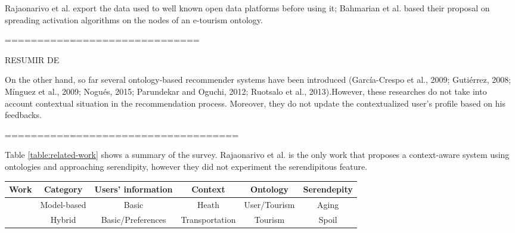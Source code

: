 Rajaonarivo et al. \cite{rajaonarivo2019rec} export the data used to well known open data platforms before using it; Bahmarian et al. \cite{bahramian_abbaspour_claramunt_2017} based their proposal on spreading activation algorithms on the nodes of an e-tourism ontology.

==============================

RESUMIR DE \cite{bahramian_abbaspour_claramunt_2017}


On  the other hand,  so  far  several  ontology-based  recommender systems  have  been  introduced (García-Crespo  et  al.,  2009;  Gutiérrez,  2008; Mínguez  et  al.,  2009;  Nogués,  2015;  Parundekar  and  Oguchi, 2012;  Ruotsalo  et  al.,  2013).However,  these  researches  do  not take  into  account  contextual  situation  in the recommendation process. Moreover, they do not update the contextualized user’s profile based on his feedbacks.

====================================


Table \ref{table:related-work} shows a summary of the survey. Rajaonarivo et al. \cite{rajaonarivo2019rec} is the only work that proposes a context-aware system using ontologies and approaching serendipity, however they did not experiment the serendipitous feature.


\begin{table*}[h!]
    \centering
    \caption{Related work on recommender systems for e-tourism}
    \label{table:related-work}
    \begin{tabular}{|c|c|c|c|c|c|} 
        \hline
        \textbf{Work} & \textbf{Category} & \textbf{Users' information} & \textbf{Context}&\textbf{Ontology}&\textbf{Serendepity} \\\hline \hline 
        & Model-based  & Basic& Heath & User/Tourism & Aging\\    \hline
                &Hybrid &Basic/Preferences & Transportation& Tourism & Spoil \\    \hline
    \end{tabular}
    
    \end{table*}


